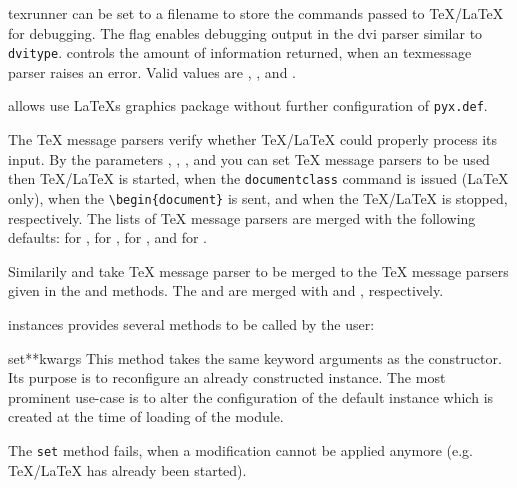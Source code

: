 \begin{classdesc}{texrunner}
   can be set to a filename to store the commands passed
  to \TeX/\LaTeX{} for debugging. The flag  enables
  debugging output in the dvi parser similar to \texttt{dvitype}.
   controls the amount of information returned, when
  an texmessage parser raises an error. Valid values are ,
  , and .

   allows use \LaTeX{}s graphics package without
  further configuration of \texttt{pyx.def}.

  The \TeX{} message parsers verify whether \TeX/\LaTeX{} could
  properly process its input. By the parameters
  , ,
  , and  you can set
  \TeX{} message parsers to be used then \TeX/\LaTeX{} is started,
  when the \texttt{documentclass} command is issued (\LaTeX{} only),
  when the \texttt{\textbackslash{}begin\{document\}} is sent, and
  when the \TeX/\LaTeX{} is stopped, respectively. The lists of
  \TeX{} message parsers are merged with the following defaults:
   for ,
   for ,
   for
  , and  for .

  Similarily  and
   take \TeX{} message parser to be merged
  to the \TeX{} message parsers given in the  and
   methods. The  and
   are merged with 
  and , respectively.
\end{classdesc}

 instances provides several methods to be called by
the user:

\begin{methoddesc}{set}{**kwargs}
  This method takes the same keyword arguments as the
   constructor. Its purpose is to reconfigure an
  already constructed  instance. The most prominent
  use-case is to alter the configuration of the default
   instance  which is created
  at the time of loading of the  module.

  The \verb|set| method fails, when a modification cannot be applied
  anymore (e.g. \TeX/\LaTeX{} has already been started).
\end{methoddesc}

